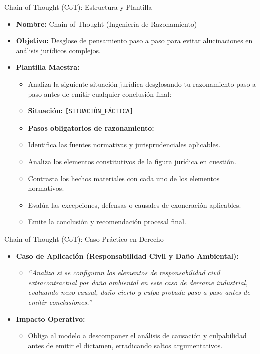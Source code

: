 \documentclass[aspectratio=169]{beamer}
\begin{document}
\begin{frame}{Chain-of-Thought (CoT): Estructura y Plantilla}


\begin{itemize}
  \item \textbf{Nombre:} Chain-of-Thought (Ingeniería de Razonamiento)
  \item \textbf{Objetivo:} Desglose de pensamiento paso a paso para evitar alucinaciones en análisis jurídicos complejos.
  \item \textbf{Plantilla Maestra:}
  \begin{itemize}
    \item Analiza la siguiente situación jurídica desglosando tu razonamiento paso a paso antes de emitir cualquier conclusión final:
    \item \textbf{Situación:} \texttt{[SITUACIÓN\_FÁCTICA]}
    \item \textbf{Pasos obligatorios de razonamiento:}
    \item Identifica las fuentes normativas y jurisprudenciales aplicables.
    \item Analiza los elementos constitutivos de la figura jurídica en cuestión.
    \item Contrasta los hechos materiales con cada uno de los elementos normativos.
    \item Evalúa las excepciones, defensas o causales de exoneración aplicables.
    \item Emite la conclusión y recomendación procesal final.
  \end{itemize}
\end{itemize}
\end{frame}

\begin{frame}{Chain-of-Thought (CoT): Caso Práctico en Derecho}


\begin{itemize}
  \item \textbf{Caso de Aplicación (Responsabilidad Civil y Daño Ambiental):}
  \begin{itemize}
    \item \textit{``Analiza si se configuran los elementos de responsabilidad civil extracontractual por daño ambiental en este caso de derrame industrial, evaluando nexo causal, daño cierto y culpa probada paso a paso antes de emitir conclusiones.''}
  \end{itemize}
  \item \textbf{Impacto Operativo:}
  \begin{itemize}
    \item Obliga al modelo a descomponer el análisis de causación y culpabilidad antes de emitir el dictamen, erradicando saltos argumentativos.
  \end{itemize}
\end{itemize}
\end{frame}
\end{document}
